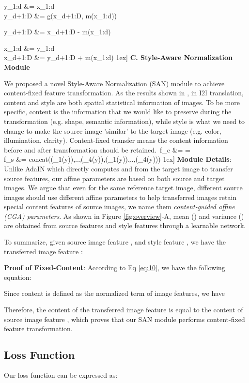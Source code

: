 \documentclass[runningheads]{llncs}
\begin{document}
      y_{1:d} &= x_{1:d}\\
      y_{d+1:D} &= g(x_{d+1:D}, m(x_{1:d}))

      y_{d+1:D} &= x_{d+1:D} - m(x_{1:d})

    x_{1:d} &= y_{1:d}\\
    x_{d+1:D} &= y_{d+1:D} + m(x_{1:d})
1ex]
\noindent \textbf{C. Style-Aware Normalization Module}

We proposed a novel Style-Aware Normalization (SAN) module to achieve content-fixed feature transformation. As the results shown in \cite{huang2017arbitrary}, in I2I translation, content and style are both spatial statistical information of images. To be more specific, content is the information that we would like to preserve during the transformation (e.g. shape, semantic information), while style is what we need to change to make the source image 'similar' to the target image (e.g. color, illumination, clarity). Content-fixed transfer means the content information before and after transformation should be retained.\
    f_c &=  = \\
    f_s &= concat(\mu({\phi_1(y)}),..,\mu(\phi_4(y)),\sigma({\phi_1(y)}),..,\sigma(\phi_4(y)))
1ex]
\noindent\textbf{Module Details}: 
Unlike AdaIN\cite{huang2017arbitrary} which directly computes  and  from the target image to transfer source features, our affine parameters are based on both source and target images. We argue that even for the same reference target image, different source images should use different affine parameters to help transferred images retain special content features of source images, we name them \textit{content-guided affine (CGA) parameters}. As shown in Figure \ref{fig:overview}-A, mean () and variance () are obtained from source features and style features through a learnable network.


To summarize, given source image feature , and style feature , we have the transferred image feature :

\noindent\textbf{Proof of Fixed-Content}: 
According to Eq \ref{eq:10}, we have the following equation:

Since content is defined as the normalized term of image features, we have

Therefore, the content of the transferred image feature  is equal to the content of source image feature , which proves that our SAN module performs content-fixed feature transformation.


\subsection{Loss Function}
\label{sec:Loss}
Our loss function can be expressed as:
\end{document}

